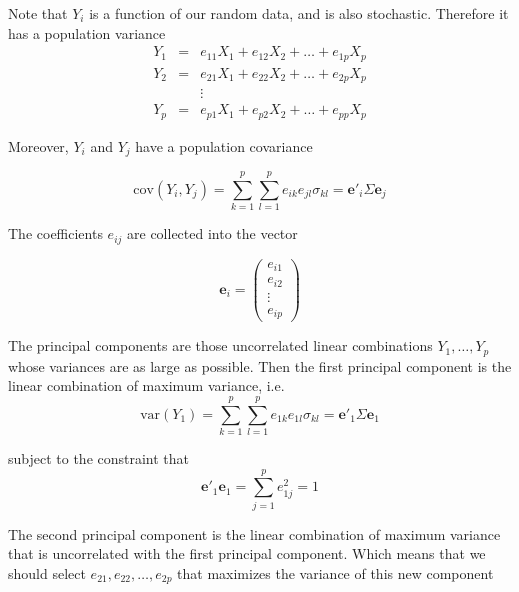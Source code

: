 Note that $ Y_i $ is a function of our random data, and is also stochastic. Therefore it has a population variance
\begin{equation}
\begin{array}{lll} 
Y_1 & = & e_{11}X_1 + e_{12}X_2 + \dots + e_{1p}X_p \\ Y_2 & = & e_{21}X_1 + e_{22}X_2 + \dots + e_{2p}X_p \\ & & \vdots \\ Y_p & = & e_{p1}X_1 + e_{p2}X_2 + \dots +e_{pp}X_p
\end{array}
\end{equation}

Moreover, $ Y_i $ and $ Y_j $ have a population covariance

\begin{equation}
\text{cov}(Y_i, Y_j) = \sum_{k=1}^{p}\sum_{l=1}^{p}e_{ik}e_{jl}\sigma_{kl} = \mathbf{e}'_i\Sigma\mathbf{e}_j
\end{equation}

The coefficients $ e_{ij} $ are collected into the vector

\begin{equation}
\mathbf{e}_i = \left(\begin{array}{c} e_{i1}\\ e_{i2}\\ \vdots \\ e_{ip}\end{array}\right)
\end{equation}

The principal components are those uncorrelated linear combinations $ Y_1,\dots,Y_p $ whose variances are as large as possible. 
Then the first principal component is the linear combination of maximum variance, i.e.
\begin{equation}
\text{var}(Y_1) = \sum_{k=1}^{p}\sum_{l=1}^{p}e_{1k}e_{1l}\sigma_{kl} = \mathbf{e}'_1\Sigma\mathbf{e}_1
\end{equation}

subject to the constraint that
\begin{equation}
\mathbf{e}'_1\mathbf{e}_1 = \sum_{j=1}^{p}e^2_{1j} = 1
\end{equation}

The second principal component is the linear combination of maximum variance that is uncorrelated with the first principal component. Which means that we should select $ e_{21}, e_{22}, \dots, e_{2p} $ that maximizes the variance of this new component

